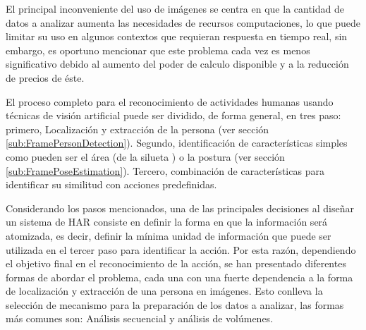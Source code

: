             El principal inconveniente del uso de imágenes se centra en que la cantidad de datos a analizar aumenta las necesidades de recursos computaciones, lo que puede limitar su uso en algunos contextos que requieran respuesta en tiempo real, sin embargo, es oportuno mencionar que este problema cada vez es menos significativo debido al aumento del poder de calculo disponible y a la reducción de precios de éste.
            
            El proceso completo para el reconocimiento de actividades humanas usando técnicas de visión artificial puede ser dividido, de forma general, en tres paso: primero, Localización y extracción de la persona (ver sección \ref{sub:FramePersonDetection}). Segundo, identificación de características simples como pueden ser el área (de la silueta \cite{Lin2016, Sokolova2013}) o la postura (ver sección \ref{sub:FramePoseEstimation}). Tercero, combinación de características para identificar su similitud con acciones predefinidas. 

            Considerando los pasos mencionados, una de las principales decisiones al diseñar un sistema de HAR consiste en definir la forma en que la información será atomizada, es decir, definir la mínima unidad de información que puede ser utilizada en el tercer paso para identificar la acción. Por esta razón, dependiendo el objetivo final en el reconocimiento de la acción, se han presentado diferentes formas de abordar el problema, cada una con una fuerte dependencia a la forma de localización y extracción de una persona en imágenes. Esto conlleva la selección de mecanismo para la preparación de los datos a analizar, las formas más comunes son: Análisis secuencial y análisis de volúmenes.
        
